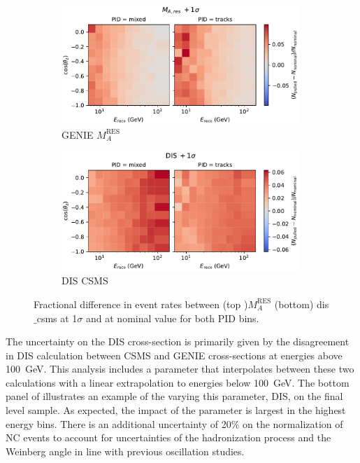 \begin{figure}[!t]
    \centering
    \begin{subfigure}[t]{0.9\textwidth}
        \centering
        \includegraphics[width=0.99\textwidth,trim={0 0 0 0.6cm},clip]{figures/measurement/systematics/xsec/Genie_Ma_RES.pdf}
        \caption{GENIE $M_{A}^\mathrm{RES}$}
    \end{subfigure}
    \begin{subfigure}[t]{0.9\textwidth}
        \centering
        \includegraphics[width=0.99\textwidth,trim={0 0 0 0.6cm},clip]{figures/measurement/systematics/xsec/dis_csms.pdf}
        \caption{DIS CSMS}
    \end{subfigure}
  \caption{Fractional difference in event rates between (top )$M_{A}^\mathrm{RES}$ (bottom) dis$\_$csms at 1$\sigma$ and at nominal value for both PID bins.
  \label{fig:template_xsecsyst}}
\end{figure}

The uncertainty on the DIS cross-section is primarily given by the disagreement in DIS calculation between CSMS\cite{csms-xsec} and GENIE\cite{Andreopoulos:2015wxa} cross-sections at energies above 100~GeV.
This analysis includes a parameter that interpolates between these two calculations with a linear extrapolation to energies below 100~GeV.
The bottom panel of  illustrates an example of the varying this parameter, DIS, on the final level sample.
As expected, the impact of the parameter is largest in the highest energy bins.
There is an additional uncertainty of 20\% on the normalization of NC events to account for uncertainties of the hadronization process and the Weinberg angle in line with previous oscillation studies\cite{Aartsen_2018}.

